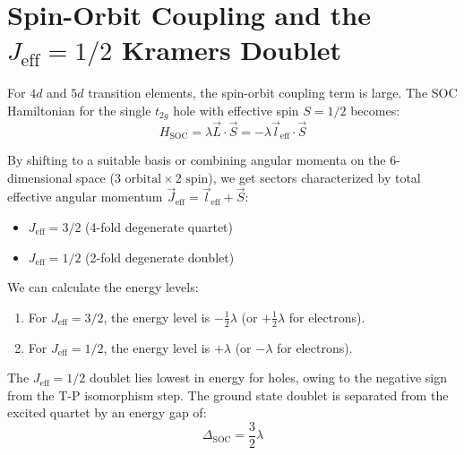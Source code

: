 \documentclass[11pt,a4paper]{article}
\begin{document}
\section{Spin-Orbit Coupling and the \texorpdfstring{$J_{\text{eff}} = 1/2$}{J_eff = 1/2} Kramers Doublet}

For $4d$ and $5d$ transition elements, the spin-orbit coupling term is large. The SOC Hamiltonian for the single $t_{2g}$ hole with effective spin $S=1/2$ becomes:
\begin{equation}
    H_{\text{SOC}} = \lambda \vec{L} \cdot \vec{S} = -\lambda \vec{l}_{\text{eff}} \cdot \vec{S}
\end{equation}

By shifting to a suitable basis or combining angular momenta on the 6-dimensional space ($3 \text{ orbital} \times 2 \text{ spin}$), we get sectors characterized by total effective angular momentum $\vec{J}_{\text{eff}} = \vec{l}_{\text{eff}} + \vec{S}$:
\begin{itemize}
    \item $J_{\text{eff}} = 3/2$ (4-fold degenerate quartet)
    \item $J_{\text{eff}} = 1/2$ (2-fold degenerate doublet)
\end{itemize}

We can calculate the energy levels:
\begin{enumerate}
    \item For $J_{\text{eff}} = 3/2$, the energy level is $-\frac{1}{2}\lambda$ (or $+\frac{1}{2}\lambda$ for electrons).
    \item For $J_{\text{eff}} = 1/2$, the energy level is $+\lambda$ (or $-\lambda$ for electrons).
\end{enumerate}

The $J_{\text{eff}} = 1/2$ doublet lies lowest in energy for holes, owing to the negative sign from the T-P isomorphism step. The ground state doublet is separated from the excited quartet by an energy gap of:
\begin{equation}
    \Delta_{\text{SOC}} = \frac{3}{2}\lambda
\end{equation}
\end{document}
